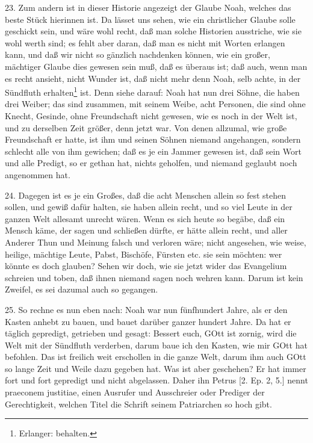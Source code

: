 23. Zum andern ist in dieser Historie angezeigt der Glaube Noah, welches das beste Stück hierinnen ist. Da lässet uns sehen, wie ein christlicher Glaube solle geschickt sein, und wäre wohl recht, daß man solche Historien ausstriche, wie sie wohl werth sind; es fehlt aber daran, daß man es nicht mit Worten erlangen kann, und daß wir nicht so gänzlich nachdenken können, wie ein großer, mächtiger Glaube dies gewesen sein muß, daß es überaus ist; daß auch, wenn man es recht ansieht, nicht Wunder ist, daß nicht mehr denn Noah, selb achte, in der Sündfluth erhalten\footnote{Erlanger: behalten.} ist. Denn siehe darauf: Noah hat nun drei Söhne, die haben drei Weiber; das sind zusammen, mit seinem Weibe, acht Personen, die sind ohne Knecht, Gesinde, ohne Freundschaft nicht gewesen, wie es noch in der Welt ist, und zu derselben Zeit größer, denn jetzt war. Von denen allzumal, wie große Freundschaft er hatte, ist ihm und seinen Söhnen niemand angehangen, sondern schlecht alle von ihm gewichen; daß es je ein Jammer gewesen ist, daß sein Wort und alle Predigt, so er gethan hat, nichts geholfen, und niemand geglaubt noch angenommen hat.

24. Dagegen ist es je ein Großes, daß die acht Menschen allein so fest stehen sollen, und gewiß dafür halten, sie haben allein recht, und so viel Leute in der ganzen Welt allesamt unrecht wären. Wenn es sich heute so begäbe, daß ein Mensch käme, der sagen und schließen dürfte, er hätte allein recht, und aller Anderer Thun und Meinung falsch und verloren wäre; nicht angesehen, wie weise, heilige, mächtige Leute, Pabst, Bischöfe, Fürsten etc. sie sein möchten: wer könnte es doch glauben? Sehen wir doch, wie sie jetzt wider das Evangelium schreien und toben, daß ihnen niemand sagen noch wehren kann. Darum ist kein Zweifel, es sei dazumal auch so gegangen.

25. So rechne es nun eben nach: Noah war nun fünfhundert Jahre, als er den Kasten anhebt zu bauen, und bauet darüber ganzer hundert Jahre. Da hat er täglich gepredigt, getrieben und gesagt: Bessert euch, GOtt ist zornig, wird die Welt mit der Sündfluth verderben, darum baue ich den Kasten, wie mir GOtt hat befohlen. Das ist freilich weit erschollen in die ganze Welt, darum ihm auch GOtt so lange Zeit und Weile dazu gegeben hat. Was ist aber geschehen? Er hat immer fort und fort gepredigt und nicht abgelassen. Daher ihn Petrus [2. Ep. 2, 5.] nennt praeconem justitiae, einen Ausrufer und Ausschreier oder Prediger der Gerechtigkeit, welchen Titel die Schrift seinem Patriarchen so hoch gibt.

